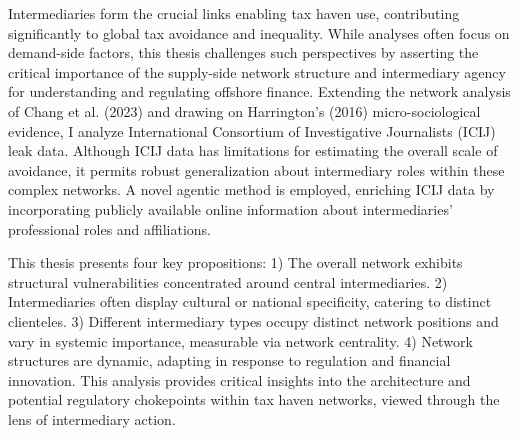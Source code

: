 \documentclass[12pt, a4paper]{report}
\begin{document}
   Intermediaries form the crucial links enabling tax haven use, contributing significantly to global tax avoidance and inequality. While analyses often focus on demand-side factors, this thesis challenges such perspectives by asserting the critical importance of the supply-side network structure and intermediary agency for understanding and regulating offshore finance. Extending the network analysis of Chang et al. (2023) and drawing on Harrington's (2016) micro-sociological evidence, I analyze International Consortium of Investigative Journalists (ICIJ) leak data. Although ICIJ data has limitations for estimating the overall scale of avoidance, it permits robust generalization about intermediary roles within these complex networks. A novel agentic method is employed, enriching ICIJ data by incorporating publicly available online information about intermediaries' professional roles and affiliations. 

   This thesis presents four key propositions: 1) The overall network exhibits structural vulnerabilities concentrated around central intermediaries. 2) Intermediaries often display cultural or national specificity, catering to distinct clienteles. 3) Different intermediary types occupy distinct network positions and vary in systemic importance, measurable via network centrality. 4) Network structures are dynamic, adapting in response to regulation and financial innovation. This analysis provides critical insights into the architecture and potential regulatory chokepoints within tax haven networks, viewed through the lens of intermediary action. 

\pagestyle{fancy} %








\appendix



\printbibliography
\end{document}
